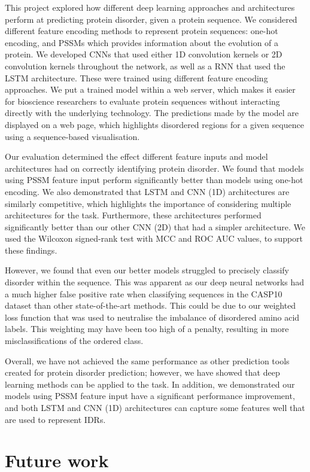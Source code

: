 \documentclass{l4proj}
\begin{document}
This project explored how different deep learning approaches and architectures perform at predicting protein disorder, given a protein sequence. We considered different feature encoding methods to represent protein sequences: one-hot encoding, and PSSMs which provides information about the evolution of a protein. We developed CNNs that used either 1D convolution kernels or 2D convolution kernels throughout the network, as well as a RNN that used the LSTM architecture. These were trained using different feature encoding approaches. We put a trained model within a web server, which makes it easier for bioscience researchers to evaluate protein sequences without interacting directly with the underlying technology. The predictions made by the model are displayed on a web page, which highlights disordered regions for a given sequence using a sequence-based visualisation.

Our evaluation determined the effect different feature inputs and model architectures had on correctly identifying protein disorder. We found that models using PSSM feature input perform significantly better than models using one-hot encoding. We also demonstrated that LSTM and CNN (1D) architectures are similarly competitive, which highlights the importance of considering multiple architectures for the task. Furthermore, these architectures performed significantly better than our other CNN (2D) that had a simpler architecture. We used the Wilcoxon signed-rank test with MCC and ROC AUC values, to support these findings.

However, we found that even our better models struggled to precisely classify disorder within the sequence. This was apparent as our deep neural networks had a much higher false positive rate when classifying sequences in the CASP10 dataset than other state-of-the-art methods. This could be due to our weighted loss function that was used to neutralise the imbalance of disordered amino acid labels. This weighting may have been too high of a penalty, resulting in more misclassifications of the ordered class.

Overall, we have not achieved the same performance as other prediction tools created for protein disorder prediction; however, we have showed that deep learning methods can be applied to the task. In addition, we demonstrated our models using PSSM feature input have a significant performance improvement, and both LSTM and CNN (1D) architectures can capture some features well that are used to represent IDRs.

\section{Future work}
\end{document}
